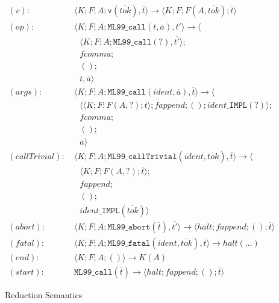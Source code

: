 \documentclass[12pt]{article}
\theoremstyle{break}
\begin{document}
\begin{figure}
    \caption{Reduction Semantics}

    \begin{align*}
        (v): & \ \langle K; F; A; \texttt{v}(\overline{tok}), \overline{t} \rangle \to
            \langle K; F; F(A, \overline{tok}); \overline{t} \rangle \\
        (op): & \ \langle K; F; A; \texttt{ML99\_call}(t, \overline{a}), \overline{t'} \rangle \to \langle \\
            & \ \ \ \ \langle K; F; A; \texttt{ML99\_call}(?), \overline{t'} \rangle; \\
            & \ \ \ \ fcomma; \\
            & \ \ \ \ (); \\
            & \ \ \ \ t, \overline{a} \rangle \\
        (args): & \ \langle K; F; A; \texttt{ML99\_call}(ident, \overline{a}), \overline{t} \rangle \to \langle \\
            & \ \ \ \ \langle \langle K; F; F(A, ?); \overline{t} \rangle; fappend; (); ident\texttt{\_IMPL}(?) \rangle; \\
            & \ \ \ \ fcomma; \\
            & \ \ \ \ (); \\
            & \ \ \ \ \overline{a} \rangle \\
        (callTrivial): & \ \langle K; F; A; \texttt{ML99\_callTrivial}(ident, \overline{tok}), \overline{t} \rangle \to \langle \\
            & \ \ \ \ \langle K; F; F(A, ?); \overline{t} \rangle; \\
            & \ \ \ \ fappend; \\
            & \ \ \ \ (); \\
            & \ \ \ \ ident\texttt{\_IMPL}(\overline{tok}) \rangle \\
        (abort): & \ \langle K; F; A; \texttt{ML99\_abort}(\overline{t}), \overline{t'} \rangle \to \langle halt; fappend; (); \overline{t} \rangle \\
        (fatal): & \ \langle K; F; A; \texttt{ML99\_fatal}(ident, \overline{tok}), \overline{t} \rangle \to halt(\ldots) \\
        (end): & \ \langle K; F; A; () \rangle \to K(A) \\
        (start): & \ \texttt{ML99\_call}(\overline{t}) \to \langle halt; fappend; (); \overline{t} \rangle
    \end{align*}
    \label{ReductionSemantics}
\end{figure}
\end{document}
